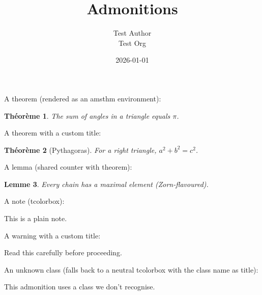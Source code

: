 \documentclass[11pt,a4paper]{article}
\title{Admonitions}
\author{Test Author \\ Test Org}
\date{2026-01-01}
\newtheorem{theorem}{Théorème}
\newtheorem{lemma}[theorem]{Lemme}
\theoremstyle{definition}
\begin{document}
\maketitle

A theorem (rendered as an amsthm environment):


\begin{theorem}
The sum of angles in a triangle equals $\pi$.
\end{theorem}


A theorem with a custom title:


\begin{theorem}[Pythagoras]
For a right triangle, $a^2 + b^2 = c^2$.
\end{theorem}


A lemma (shared counter with theorem):


\begin{lemma}
Every chain has a maximal element (Zorn-flavoured).
\end{lemma}


A note (tcolorbox):


\begin{tcolorbox}[breakable, colback=blue!5, colframe=blue!60, title=Note]
This is a plain note.
\end{tcolorbox}


A warning with a custom title:


\begin{tcolorbox}[breakable, colback=orange!5, colframe=orange!70, title=À lire avant tout]
Read this carefully before proceeding.
\end{tcolorbox}


An unknown class (falls back to a neutral tcolorbox with the class name as title):


\begin{tcolorbox}[breakable, colback=gray!5, colframe=gray!50, title=Unknown-class]
This admonition uses a class we don't recognise.
\end{tcolorbox}
\end{document}
